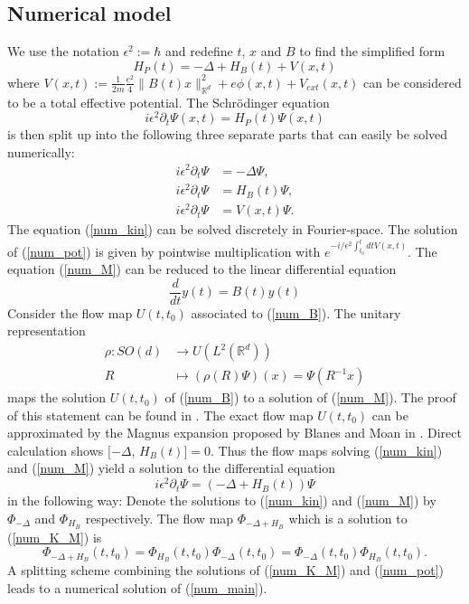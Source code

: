 \documentclass[11pt, a4paper, oneside]{article}
\begin{document}
\subsection{Numerical model}
We use the notation $\epsilon ^2 := \hbar$ and redefine $t$, $x$ and $B$ to find the simplified form
\begin{equation*}
  H_P(t) = -\Delta + H_B(t) + V(x,t)
\end{equation*}
where $V(x,t) := \frac{1}{2m}\frac{e^{2}}{4}\|B(t) x\|_{\mathbb{R}^{d}}^{2} + e \phi(x,t) + V_{ext}(x,t)$ can be considered to be a total effective potential.
The Schr{\"o}dinger equation
\begin{equation*} \label{num_main} \tag{H}
  i \epsilon ^2 \partial_t \Psi(x, t) = H_P(t)\Psi(x,t)
\end{equation*}
is then split up into the following three separate parts that can easily be solved numerically:
\begin{align}
  i \epsilon^2 \partial_t \Psi &= -\Delta \Psi \label{num_kin} \tag{K},\\
  i \epsilon^2 \partial_t \Psi &= H_B(t) \Psi \label{num_M} \tag{M},\\
  i \epsilon^2 \partial_t \Psi &= V(x,t) \Psi \label{num_pot} \tag{P}.
\end{align}
The equation (\ref{num_kin}) can be solved discretely in Fourier-space. The solution of (\ref{num_pot}) is given by pointwise multiplication with $e^{-i/\epsilon ^2 \int_{t_0}^t dt V(x,t)}$. The equation (\ref{num_M}) can be reduced to the linear differential equation
\begin{equation} \label{num_B} \tag{B}
  \frac{d}{dt}y(t) = B(t)y(t)
\end{equation}
Consider the flow map $U(t,t_0)$ associated to (\ref{num_B}). The unitary representation
\begin{align} \label{eq_rho}
  \rho : SO(d) &\longrightarrow U(L^2(\mathbb{R}^d)) \\
  R &\longmapsto (\rho (R)\Psi)(x) = \Psi(R^{-1} x)
\end{align}
maps the solution $U(t, t_0)$ of (\ref{num_B}) to a solution of (\ref{num_M}). The proof of this statement can be found in . The exact flow map $U(t, t_0)$ can be approximated by the Magnus expansion proposed by Blanes and Moan in .
Direct calculation shows  $[-\Delta$, $H_B(t)] = 0$. Thus the flow maps solving (\ref{num_kin}) and (\ref{num_M}) yield a solution to the differential equation
\begin{equation} \label{num_K_M} \tag{K+M}
  i \epsilon ^2 \partial_t \Psi = (-\Delta + H_B(t))\Psi
\end{equation}
in the following way: Denote the solutions to (\ref{num_kin}) and (\ref{num_M}) by $\Phi_{-\Delta}$ and $\Phi_{H_B}$ respectively. The flow map $\Phi_{-\Delta + H_B}$ which is a solution to (\ref{num_K_M}) is
\begin{equation*}
  \Phi_{-\Delta + H_B}(t, t_0) = \Phi_{H_B}(t, t_0)\Phi_{-\Delta}(t, t_0) = \Phi_{-\Delta}(t, t_0)\Phi_{H_B}(t, t_0).
\end{equation*}
A splitting scheme combining the solutions of (\ref{num_K_M}) and (\ref{num_pot}) leads to a numerical solution of (\ref{num_main}).
\end{document}
